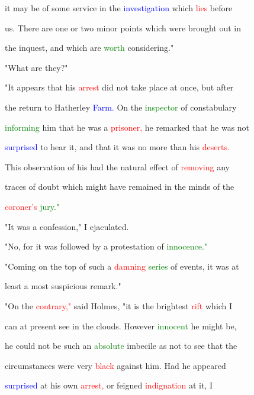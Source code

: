  it may be of some service in the \textcolor{blue}{investigation} which \textcolor{red}{lies} before

 us. There are one or two minor points which were brought out in

 the inquest, and which are \textcolor{green}{worth} considering."



 "What are they?"



 "It appears that his \textcolor{red}{arrest} did not take place at once, but after

 the return to Hatherley \textcolor{blue}{Farm.} On the \textcolor{green}{inspector} of constabulary

 \textcolor{green}{informing} him that he was a \textcolor{red}{prisoner,} he remarked that he was not

 \textcolor{blue}{surprised} to hear it, and that it was no more than his \textcolor{red}{deserts.}

 This observation of his had the natural effect of \textcolor{red}{removing} any

 traces of \textcolor{BurntOrange}{doubt} which might have remained in the minds of the

 \textcolor{red}{coroner's} \textcolor{green}{jury."}



 "It was a \textcolor{BurntOrange}{confession,"} I ejaculated.



 "No, for it was followed by a protestation of \textcolor{green}{innocence."}



 "Coming on the \textcolor{BurntOrange}{top} of such a \textcolor{red}{damning} \textcolor{green}{series} of events, it was at

 least a most \textcolor{BurntOrange}{suspicious} remark."



 "On the \textcolor{red}{contrary,"} said Holmes, "it is the brightest \textcolor{red}{rift} which I

 can at \textcolor{BurntOrange}{present} see in the clouds. However \textcolor{green}{innocent} he might be,

 he could not be such an \textcolor{green}{absolute} imbecile as not to see that the

 circumstances were very \textcolor{red}{black} against him. Had he appeared

 \textcolor{blue}{surprised} at his own \textcolor{red}{arrest,} or feigned \textcolor{red}{indignation} at it, I

